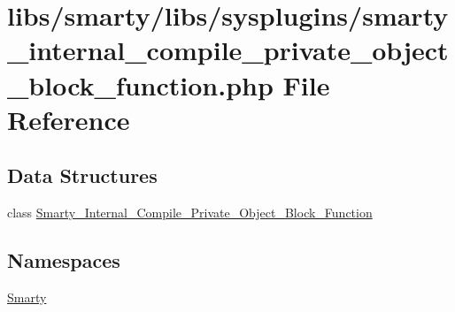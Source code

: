 \hypertarget{smarty__internal__compile__private__object__block__function_8php}{}\section{libs/smarty/libs/sysplugins/smarty\+\_\+internal\+\_\+compile\+\_\+private\+\_\+object\+\_\+block\+\_\+function.php File Reference}
\label{smarty__internal__compile__private__object__block__function_8php}
\subsection*{Data Structures}
\begin{DoxyCompactItemize}
\item 
class \hyperlink{class_smarty___internal___compile___private___object___block___function}{Smarty\+\_\+\+Internal\+\_\+\+Compile\+\_\+\+Private\+\_\+\+Object\+\_\+\+Block\+\_\+\+Function}
\end{DoxyCompactItemize}
\subsection*{Namespaces}
\begin{DoxyCompactItemize}
\item 
 \hyperlink{namespace_smarty}{Smarty}
\end{DoxyCompactItemize}
